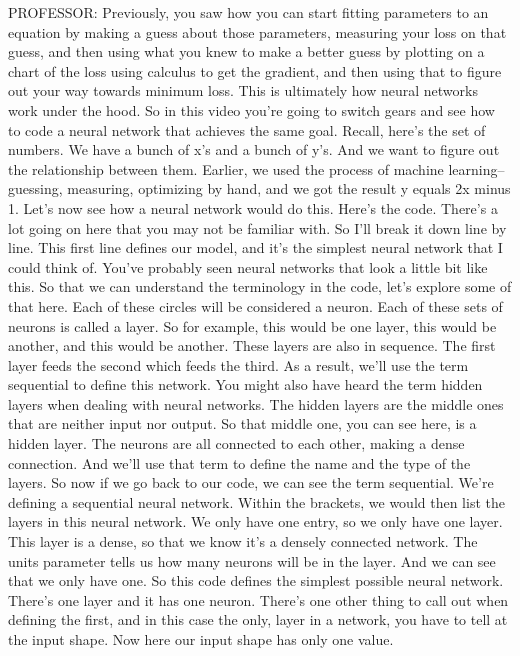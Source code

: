 PROFESSOR: Previously, you saw how you can start fitting parameters
to an equation by making a guess about those parameters,
measuring your loss on that guess, and then
using what you knew to make a better guess by plotting
on a chart of the loss using calculus to get the gradient,
and then using that to figure out your way towards minimum loss.
This is ultimately how neural networks work under the hood.
So in this video you're going to switch gears and see
how to code a neural network that achieves the same goal.
Recall, here's the set of numbers.
We have a bunch of x's and a bunch of y's.
And we want to figure out the relationship between them.
Earlier, we used the process of machine learning-- guessing, measuring,
optimizing by hand, and we got the result y equals 2x minus 1.
Let's now see how a neural network would do this.
Here's the code.
There's a lot going on here that you may not be familiar with.
So I'll break it down line by line.
This first line defines our model, and it's the simplest neural network
that I could think of.
You've probably seen neural networks that look a little bit like this.
So that we can understand the terminology in the code,
let's explore some of that here.
Each of these circles will be considered a neuron.
Each of these sets of neurons is called a layer.
So for example, this would be one layer, this would be another,
and this would be another.
These layers are also in sequence.
The first layer feeds the second which feeds the third.
As a result, we'll use the term sequential to define this network.
You might also have heard the term hidden layers
when dealing with neural networks.
The hidden layers are the middle ones that are neither input nor output.
So that middle one, you can see here, is a hidden layer.
The neurons are all connected to each other, making a dense connection.
And we'll use that term to define the name and the type of the layers.
So now if we go back to our code, we can see the term sequential.
We're defining a sequential neural network.
Within the brackets, we would then list the layers in this neural network.
We only have one entry, so we only have one layer.
This layer is a dense, so that we know it's a densely connected network.
The units parameter tells us how many neurons will be in the layer.
And we can see that we only have one.
So this code defines the simplest possible neural network.
There's one layer and it has one neuron.
There's one other thing to call out when defining
the first, and in this case the only, layer in a network,
you have to tell at the input shape.
Now here our input shape has only one value.
